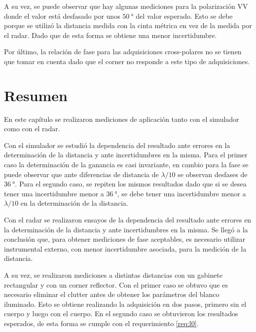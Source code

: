 \begin{description}
  A su vez, se puede observar que hay algunas mediciones para la polarización VV donde el valor está desfasado por unos $\SI{50}{\degree}$ del valor esperado. Esto se debe porque se utilizó la distancia medida con la cinta métrica en vez de la medida por el radar. Dado que de esta forma se obtiene una menor incertidumbre.

  Por último, la relación de fase para las adquisiciones cross-polares no se tienen que tomar en cuenta dado que el corner no responde a este tipo de adquisiciones.
\end{description}


\section{Resumen}

En este capítulo se realizaron mediciones de aplicación tanto con el simulador como con el radar.

Con el simulador se estudió la dependencia del resultado ante errores en la determinación de la distancia y ante incertidumbres en la misma. Para el primer caso la determinación de la ganancia es casi invariante, en cambio para la fase se puede observar que ante diferencias de distancia de $\lambda / 10$ se observan desfases de $\SI{36}{\degree}$. Para el segundo caso, se repiten los mismos resultados dado que si se desea tener una incertidumbre menor a $\SI{36}{\degree}$, se debe tener una incertidumbre menor a $\lambda / 10$ en la determinación de la distancia.

Con el radar se realizaron ensayos de la dependencia del resultado ante errores en la determinación de la distancia y ante incertidumbres en la misma. Se llegó a la conclusión que, para obtener mediciones de fase aceptables, es necesario utilizar instrumental externo, con menor incertidumbre asociada, para la medición de la distancia.

A su vez, se realizaron mediciones a distintas distancias con un gabinete rectangular y con un corner reflector. Con el primer caso se obtuvo que es necesario eliminar el clutter antes de obtener los parámetros del blanco iluminado. Esto se obtiene realizando la adquisición en dos pasos, primero sin el cuerpo y luego con el cuerpo. En el segundo caso se obtuvieron los resultados esperados, de esta forma se cumple con el requerimiento \ref{req:l0}.

